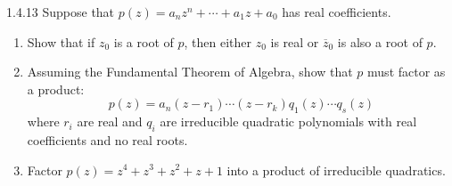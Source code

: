 \documentclass[12pt]{amsart}
\begin{document}
\begin{problem}{1.4.13}
    Suppose that $p(z) = a_nz^n + \cdots + a_1z + a_0$ has real coefficients. 
    \begin{enumerate}
        \item Show that if $z_0$ is a root of $p$, then either $z_0$ is real or $\overline{z}_0$ is also a root of $p$. 
        \item Assuming the Fundamental Theorem of Algebra, show that $p$ must factor as a product: 
        \[ p(z) = a_n(z-r_1)\cdots(z-r_k)q_1(z)\cdots q_s(z)\]
        where $r_i$ are real and $q_i$ are irreducible quadratic polynomials with real coefficients and no real roots. 
        \item Factor $p(z) = z^4 + z^3 + z^2 + z + 1$ into a product of irreducible quadratics. 
    \end{enumerate}
\end{problem}
\end{document}

